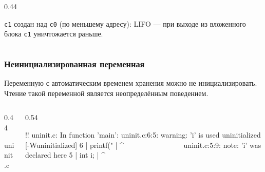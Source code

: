 \documentclass[compress, 8pt, aspectratio=169]{beamer}
\begin{document}
\begin{frame}[fragile]
\begin{columns}[T]
\begin{column}{0.44\textwidth}
\begin{center}

            \end{center}

            \footnotesize
            \texttt{c1} создан над \texttt{c0} (по меньшему
            адресу): LIFO --- при выходе из вложенного блока
            \texttt{c1} уничтожается раньше.

        \end{column}

    \end{columns}

\end{frame}

\begin{frame}[fragile]

    \frametitle{Неинициализированная переменная}

    Переменную с автоматическим временем хранения можно
    не инициализировать.
    Чтение такой переменной является неопределённым
    поведением.

    \begin{columns}[T]

        \begin{column}{0.44\textwidth}

                {uninit.c}

        \end{column}

        \begin{column}{0.54\textwidth}

            \begin{terminalwindow}
!!
uninit.c: In function 'main':
uninit.c:6:5: warning: 'i' is used uninitialized [-Wuninitialized]
    6 |     printf("%
      |     ^~~~~~~~~~~~~~~~~
uninit.c:5:9: note: 'i' was declared here
    5 |     int i;
      |         ^
            \end{terminalwindow}

        \end{column}

    \end{columns}

\end{frame}
\end{document}
